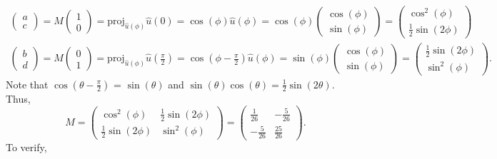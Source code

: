 \documentclass[12pt]{article}
\begin{document}
\begin{gather*}
	\begin{pmatrix} a \\ c \end{pmatrix}
	=
	M \begin{pmatrix} 1 \\ 0 \end{pmatrix}
	=
	\text{proj}_{\hat u(\phi)} \hat u(0)
	=
	\cos(\phi) \hat u(\phi)
	=
	\cos(\phi)
	\begin{pmatrix}
		\cos(\phi) \\
		\sin(\phi)
	\end{pmatrix}
	=
	\begin{pmatrix}
		\cos^2(\phi) \\
		\frac{1}{2}\sin(2\phi)
	\end{pmatrix}
	\\
	\begin{pmatrix} b \\ d \end{pmatrix}
	=
	M \begin{pmatrix} 0 \\ 1 \end{pmatrix}
	=
	\text{proj}_{\hat u(\phi)} \hat u(\frac{\pi}{2})
	=
	\cos(\phi - \frac{\pi}{2}) \hat u(\phi)
	=
	\sin(\phi)
	\begin{pmatrix}
		\cos(\phi) \\
		\sin(\phi)
	\end{pmatrix}
	=
	\begin{pmatrix}
		\frac{1}{2}\sin(2\phi) \\
		\sin^2(\phi)
	\end{pmatrix}
	.
\end{gather*}
Note that 
$\cos(\theta - \frac{\pi}{2})$ = $\sin(\theta)$ and	
$\sin(\theta)\cos(\theta) = \frac{1}{2}\sin(2\theta)$.
\normalsize
\\[\baselineskip]
Thus,
\begin{equation*}
	M
	=
	\begin{pmatrix}
		\cos^2(\phi) & \frac{1}{2}\sin(2\phi) \\
		\frac{1}{2}\sin(2\phi) & \sin^2(\phi)
	\end{pmatrix}
	=
	\boxed{
		\begin{pmatrix}
			\frac{1}{26} & -\frac{5}{26} \\
			-\frac{5}{26} & \frac{25}{26}
		\end{pmatrix}
	}
	.
\end{equation*}
To verify,
\end{document}
